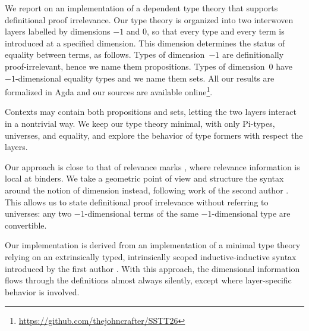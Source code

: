 \documentclass{sstt-2026-abstract}
\begin{document}

\color{black} %

We report on an implementation of a dependent type theory that supports
definitional proof irrelevance. Our type theory is organized into two
interwoven layers labelled by dimensions $-1$ and $0$, so that every type and
every term is introduced at a specified dimension. This dimension determines
the status of equality between terms, as follows. Types of dimension~$-1$ are
definitionally proof-irrelevant, hence we name them propositions. Types of
dimension~$0$ have $-1$-dimensional equality types and we name them sets. All
our results are formalized in Agda \cite{Agda} and our sources are available
online\footnote{\url{https://github.com/thejohncrafter/SSTT26}}.


Contexts may contain both propositions and sets, letting the two layers
interact in a nontrivial way. We keep our type theory minimal, with only
Pi-types, universes, and equality, and explore the behavior of type formers
with respect the layers.


Our approach is close to that of relevance marks \cite{proofirrelwithoutk},
where relevance information is local at binders. We take a geometric point of
view and structure the syntax around the notion of dimension instead, following
work of the second author \cite{despalungue}. This allows us to state
definitional proof irrelevance without referring to universes: any two
$-1$-dimensional terms of the same $-1$-dimensional type are convertible.


Our implementation is derived from an implementation of a minimal type theory
relying on an extrinsically typed, intrinsically scoped inductive-inductive
syntax introduced by the first author \cite{marquet}. With this approach, the
dimensional information flows through the definitions almost always silently,
except where layer-specific behavior is involved.

\printbibliography
\end{document}
